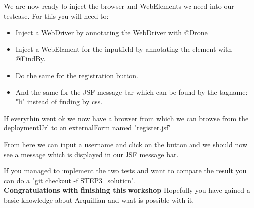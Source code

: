 \documentclass[paper=a4, fontsize=11pt]{scrartcl}
\begin{document}
We are now ready to inject the browser and WebElements we need into our testcase.
For this you will need to:
\begin{itemize}
		\item  Inject a WebDriver by annotating the WebDriver with @Drone
		\item Inject a WebElement for the inputfield by annotating the element
			with @FindBy.
		\item Do the same for the registration button.
		\item And the same for the JSF message bar which can be found by the
			tagname: "li" instead of finding by css.
\end{itemize}

If everythin went ok we now have a browser from which we can browse from
the deploymentUrl to an externalForm named "register.jsf"
\par
From here we can input a username and click on the button and we should now see
a message which is displayed in our JSF message bar.
\par
If you managed to implement the two tests and want to compare the result you can do
a "git checkout -f STEP3\_solution".\\

\textbf{Congratulations with finishing this workshop} Hopefully you have gained a
basic knowledge about Arquillian and what is possible with it.
\end{document}
